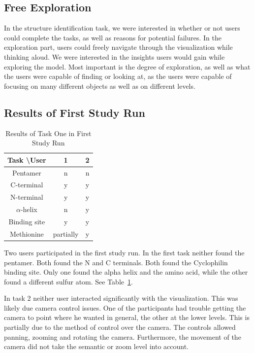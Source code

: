 \documentclass[review,journal]{vgtc}         %
\begin{document}
	
	
	
	
	\subsection{Free Exploration}
	In the structure identification task, we were interested in whether or not users could complete the tasks, as well as reasons for potential failures. 
	In the exploration part, users could freely navigate through the visualization while thinking aloud. We were interested in the insights users would gain while exploring the model.
	Most important is the degree of exploration, as well as what the users were capable of finding or looking at, as the users were capable of focusing on many different objects as well as on different levels.
	
	\subsection{Results of First Study Run}
	\begin{table}
		
		\centering
		\begin{tabular}{| c | c | c |}
			\hline
			Task \textbackslash User & 1 & 2  \\
			\hline
			Pentamer       & n & n \\
			\hline
			C-terminal     & y & y \\
			\hline
			N-terminal     & y & y \\
			\hline
			$\alpha$-helix & n & y \\
			\hline
			Binding site   & y & y\\
			\hline
			Methionine      & partially & y \\
			\hline
		\end{tabular}
		\label{tableIterationOne}		
		\caption{Results of Task One in First Study Run}
	\end{table}
	
	
	Two users participated in the first study run. 
	In the first task neither found the pentamer. 
	Both found the N and C terminals. 
	Both found the Cyclophilin binding site. 
	Only one found the alpha helix and the amino acid, while the other found a different sulfur atom.
	See Table~\ref{tableIterationOne}.
	
	In task 2 neither user interacted significantly with the visualization. This was likely due camera control issues. 
	One of the participants had trouble getting the camera to point where he wanted in general, the other at the lower levels.
	This is partially due to the method of control over the camera. 
	The controls allowed panning, zooming and rotating the camera. 
	Furthermore, the movement of the camera did not take the semantic or zoom level into account.
	
\end{document}
